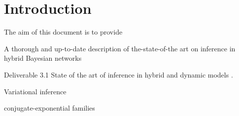 \section{Introduction}

The aim of this document is to provide 


A thorough and up-to-date description of the-state-of-the art on inference in hybrid Bayesian networks





Deliverable 3.1 State of the art of inference in hybrid and dynamic models \cite{Deliverable 3.1}.


Variational inference  \cite{Jordan1999,Attias2000}

conjugate-exponential families \cite{Attias2000,Beal2003,Bishop2005}